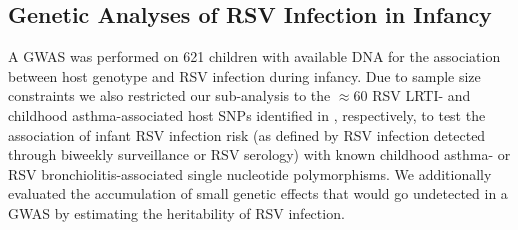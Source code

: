 \documentclass{article} %
\begin{document}
\subsection{Genetic Analyses of RSV Infection in Infancy}
A GWAS was performed on 621 children with available DNA for the association between host genotype and RSV infection during infancy.
Due to sample size constraints we also restricted our sub-analysis to the $\approx 60$ RSV LRTI- and childhood asthma-associated host SNPs identified in 
\citet{pividori2019shared, janssen2007genetic, pasanen2017genome}, 
respectively, to test the association of infant RSV infection risk (as defined by RSV infection detected through biweekly surveillance or RSV serology) with known childhood asthma- or RSV bronchiolitis-associated single nucleotide polymorphisms.
We additionally evaluated the accumulation of small genetic effects that would go undetected in a GWAS by estimating the heritability of RSV infection. 
\end{document}
